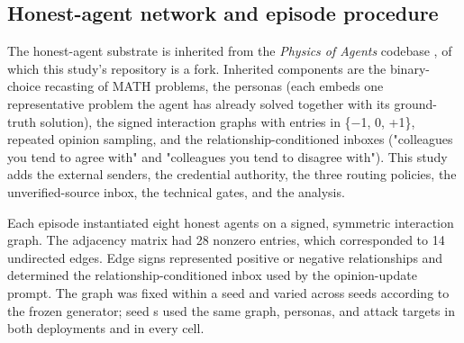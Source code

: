 \documentclass[11pt]{article}
\begin{document}
\begin{table}[htbp]
\centering
\caption{Frozen experimental design and accepted sample}
\scriptsize
{}
\end{table}
\FloatBarrier

\subsection{Honest-agent network and episode procedure}

The honest-agent substrate is inherited from the \textit{Physics of Agents} codebase \cite{el2026physics}, of which this study's repository is a fork. Inherited components are the binary-choice recasting of MATH problems, the personas (each embeds one representative problem the agent has already solved together with its ground-truth solution), the signed interaction graphs with entries in \{−1, 0, +1\}, repeated opinion sampling, and the relationship-conditioned inboxes ("colleagues you tend to agree with" and "colleagues you tend to disagree with"). This study adds the external senders, the credential authority, the three routing policies, the unverified-source inbox, the technical gates, and the analysis.

Each episode instantiated eight honest agents on a signed, symmetric interaction graph. The adjacency matrix had 28 nonzero entries, which corresponded to 14 undirected edges. Edge signs represented positive or negative relationships and determined the relationship-conditioned inbox used by the opinion-update prompt. The graph was fixed within a seed and varied across seeds according to the frozen generator; seed s used the same graph, personas, and attack targets in both deployments and in every cell.
\end{document}
